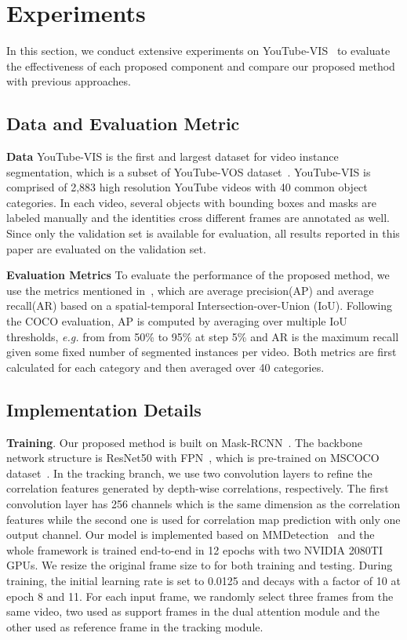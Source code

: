 \documentclass[letterpaper]{article} \usepackage{aaai21}  \usepackage{times}  \usepackage{helvet} \usepackage{courier}  \usepackage[hyphens]{url}  \usepackage{graphicx} \urlstyle{rm} \def\UrlFont{\rm}  \usepackage{natbib}  \usepackage{caption} \frenchspacing  \setlength{\pdfpagewidth}{8.5in}  \setlength{\pdfpageheight}{11in}  \newcommand{\etal}{\emph{et al. }}
\newcommand{\eg}{\emph{e.g. }}
\begin{document}
 \section{Experiments}\label{exp}
In this section, we conduct extensive experiments on YouTube-VIS~\cite{yang2019video} to evaluate the effectiveness of each proposed component and compare our proposed method with previous approaches.
\subsection{Data and Evaluation Metric}
{\bf Data} YouTube-VIS is the first and largest dataset for video instance segmentation, which is a subset of YouTube-VOS dataset~\cite{xu2018youtube}.
YouTube-VIS is comprised of 2,883 high resolution YouTube videos with 40 common object categories. In each video, several objects with bounding boxes and masks are labeled manually and the identities cross different frames are annotated as well. Since only the validation set is available for evaluation, all results reported in this paper are evaluated on the validation set.

{\bf Evaluation Metrics}
To evaluate the performance of the proposed method, we use the metrics mentioned in~\cite{yang2019video}, which are average precision(AP) and average recall(AR) based on a spatial-temporal Intersection-over-Union (IoU). Following the COCO evaluation, AP is computed by averaging over multiple IoU thresholds, \eg from from 50\% to 95\% at step 5\% and AR is the maximum recall given some fixed number of segmented instances per video. Both metrics are first calculated for each category and then averaged over 40 categories. 

\subsection{Implementation Details}

{\bf Training}. Our proposed method is built on Mask-RCNN~\cite{he2017mask}. The backbone network structure is ResNet50 with FPN~\cite{lin2017feature}, which is pre-trained on MSCOCO dataset~\cite{lin2014microsoft}. 
In the tracking branch, we use two convolution layers to refine the correlation features generated by depth-wise correlations, respectively. The first convolution layer has 256 channels which is the same dimension as the correlation features while the second one is used for correlation map prediction with only one output channel. 
Our model is implemented based on MMDetection~\cite{chen2019mmdetection} and the whole framework is trained end-to-end in 12 epochs with two NVIDIA 2080TI GPUs. We resize the original frame size to  for both training and testing. During training, the initial learning rate is set to 0.0125 and decays with a factor of 10 at epoch 8 and 11. For each input frame, we randomly select three frames from the same video, two used as support frames in the dual attention module and the other used as reference frame in the tracking module.
\end{document}
